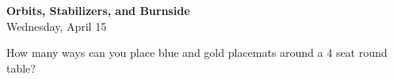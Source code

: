 \documentclass[12pt]{article}
\theoremstyle{plain}
\theoremstyle{definition}
\theoremstyle{remark}
\begin{document}
\Large
\begin{center}
 \textbf{\LARGE Orbits, Stabilizers, and Burnside}\\
 Wednesday, April 15
\end{center}

How many ways can you place blue and gold placemats around a 4 seat round table?

\clearpage
~~
\clearpage
~~
\clearpage
~~
\end{document}
